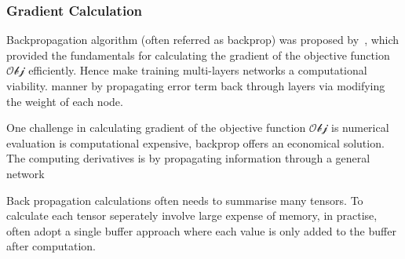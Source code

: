 \subsubsection{Gradient Calculation}
Backpropagation algorithm (often referred as backprop) was proposed by~\citet{werbos1975beyond}, which provided the fundamentals for calculating the gradient of the objective function $\mathcal{Obj}$ efficiently. Hence make training multi-layers networks a computational viability. manner by propagating error term back through layers via modifying the weight of each node. 
\par
One challenge in calculating gradient of the objective function $\mathcal{Obj}$ is numerical evaluation is computational expensive, backprop offers an economical solution. The computing derivatives is by propagating information through a general network 
\par 
Back propagation calculations often needs to summarise many tensors. To calculate each tensor seperately involve large expense of memory, in practise, often adopt a single buffer approach where each value is only added to the buffer after computation.